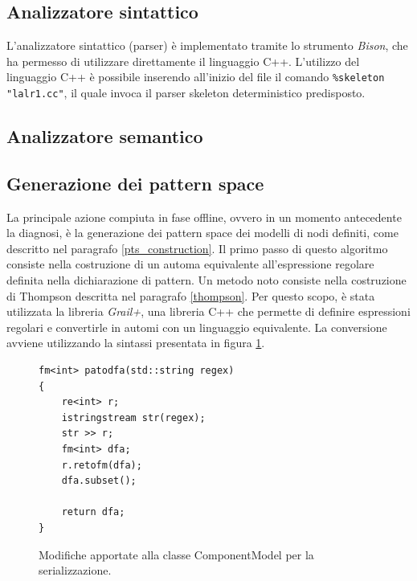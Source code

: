 \subsection{Analizzatore sintattico}
L'analizzatore sintattico (parser) è implementato tramite lo strumento \emph{Bison}, che ha permesso di utilizzare direttamente il linguaggio C++. L'utilizzo del linguaggio C++ è possibile inserendo all'inizio del file il comando \verb|%skeleton "lalr1.cc"|, il quale invoca il parser skeleton deterministico predisposto.




\subsection{Analizzatore semantico}


\subsection{Generazione dei pattern space}
La principale azione compiuta in fase offline, ovvero in un momento antecedente la diagnosi, è la generazione dei pattern space dei modelli di nodi definiti, come descritto nel paragrafo \ref{pts_construction}. 
Il primo passo di questo algoritmo consiste nella costruzione di un automa equivalente all'espressione regolare definita nella dichiarazione di pattern. Un metodo noto consiste nella costruzione di Thompson descritta nel paragrafo \ref{thompson}. 
Per questo scopo, è stata utilizzata la libreria \emph{Grail+}\cite{web:grail}, una libreria C++ che permette di definire espressioni regolari e convertirle in automi con un linguaggio equivalente.
La conversione avviene utilizzando la sintassi presentata in figura \ref{code:patodfa}.

\begin{figure}[htbp]
\begin{verbatim}
fm<int> patodfa(std::string regex)
{
    re<int> r;
    istringstream str(regex);
    str >> r;
    fm<int> dfa;
    r.retofm(dfa);
    dfa.subset();

    return dfa;
}
\end{verbatim}
\caption{Modifiche apportate alla classe ComponentModel per la serializzazione.}
\label{code:patodfa}
\end{figure}

